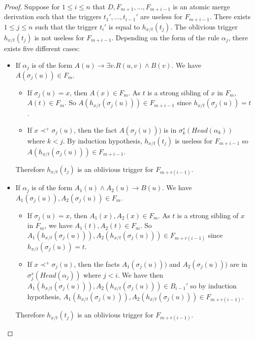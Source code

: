 \documentclass{article}
\theoremstyle{definition}
\theoremstyle{remark}
\begin{document}
\begin{proof}
Suppose for $1 \leq i \leq n$ that $D, F_{m+1}, \ldots, F_{m+i-1}$ is an atomic merge derivation such that the triggers $t_1',\ldots,t_{i-1}'$ are useless for $F_{m+i-1}$. There exists $1 \leq j \leq n$ such that the trigger $t_i'$ is equal to $h_{x/t}(t_j)$. The oblivious trigger $h_{x/t}(t_j)$ is not useless for $F_{m+i-1}$. Depending on the form of the rule $\alpha_j$, there exists five different cases:
	\begin{itemize}
	\item If $\alpha_j$ is of the form $A(u) \rightarrow \exists v.R(u,v) \wedge B(v)
	$. We have $A(\sigma_j(u)) \in F_m$.
		\begin{itemize}
		\item If $\sigma_j(u) = x$, then $A(x) \in F_m$. As $t$ is a strong sibling of $x$ in $F_m$, $A(t) \in F_m$. So $A(h_{x/t}(\sigma_j(u))) \in F_{m+i-1}$ since $h_{x/t}(\sigma_j(u)) = t$.  
		\item If $x \prec^+ \sigma_j(u)$, then the fact $A(\sigma_j(u)))$ is in $\sigma_k^s(Head(\alpha_k))$ where $k<j$. By induction hypothesis, $h_{x/t}(t_j)$ is useless for $F_{m+i-1}$ so  $A(h_{x/t}(\sigma_j(u)))\in F_{m+i-1}$. 
		\end{itemize}
Therefore $h_{x/t}(t_j)$ is an oblivious trigger for $F_{m+r(i-1)}$.
	\item If $\alpha_j$ is of the form $A_1(u) \wedge A_2(u) \rightarrow B(u)$. We have $A_1(\sigma_j(u)),A_2(\sigma_j(u)) \in F_m$.
		\begin{itemize}
		\item If $\sigma_j(u) = x$, then $A_1(x),A_2(x) \in F_m$. As $t$ is a strong sibling of $x$ in $F_m$, we have $A_1(t),A_2(t) \in F_m$. So $A_1(h_{x/t}(\sigma_j(u))),A_2(h_{x/t}(\sigma_j(u))) \in F_{m+r(i-1)}$ since $h_{x/t}(\sigma_j(u)) = t$.  
		\item If $x \prec^+ \sigma_j(u)$, then the facts $A_1(\sigma_j(u)))$ and $A_2(\sigma_j(u)))$ are in $\sigma_j^s(Head(\alpha_j))$ where $j<i$. We have then $A_1(h_{x/t}(\sigma_j(u))),A_2(h_{x/t}(\sigma_j(u)))\in B_{i-1}'$ so by induction hypothesis, $A_1(h_{x/t}(\sigma_j(u))),A_2(h_{x/t}(\sigma_j(u)))\in F_{m+r(i-1)}$. 
		\end{itemize}
Therefore $h_{x/t}(t_j)$ is an oblivious trigger for $F_{m+r(i-1)}$.  


\end{itemize}
\end{proof}
\end{document}
